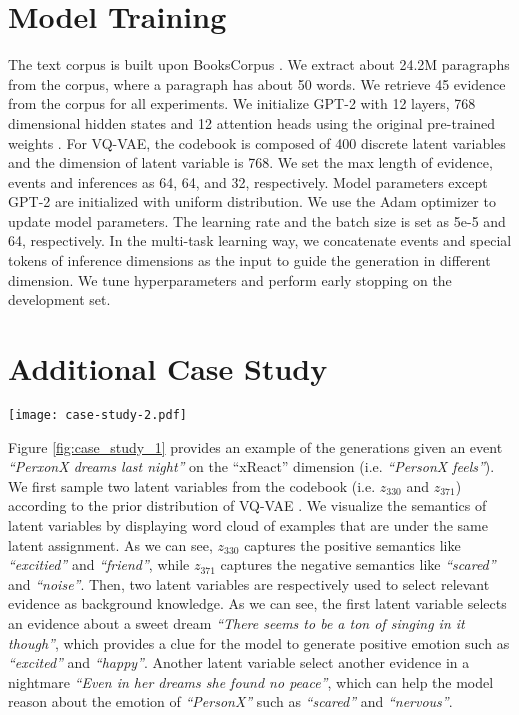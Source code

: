 \documentclass[11pt,a4paper]{article}
\begin{document}
\section{Model Training}
The text corpus is built upon BooksCorpus \cite{zhu2015aligning}. We extract about 24.2M paragraphs from the corpus, where a paragraph has about 50 words. We retrieve 45 evidence from the corpus for all experiments. We initialize GPT-2 with 12 layers, 768 dimensional hidden states and 12 attention heads using the original pre-trained weights \cite{radford2019language}. For VQ-VAE, the codebook is composed of 400 discrete latent variables and the dimension of latent variable is 768. We set the max length of evidence, events and inferences as 64, 64, and 32, respectively.
Model parameters except GPT-2 are initialized with uniform distribution. We use the Adam optimizer to update model parameters. The learning rate and the batch size is set as 5e-5 and 64, respectively.  In the multi-task learning way, we concatenate events and special tokens of inference dimensions as the input to guide the generation in different dimension. We tune hyperparameters and perform early stopping on the development set.

\section{Additional Case Study}
\begin{figure*}[t]
	\centering
	\texttt{[image: case-study-2.pdf]}
	\caption{An examples of Event2Mind dataset on the xReact dimension (i.e. \textit{``PersonX feels''}).}
	\label{fig:case_study_1}
\end{figure*}
Figure \ref{fig:case_study_1} provides an example of the generations given an event \textit{``PerxonX dreams last night''} on the ``xReact'' dimension (i.e. \textit{``PersonX feels''}). We first sample two latent variables from the codebook (i.e. $z_{330}$ and $z_{371}$) according to the prior distribution of VQ-VAE \cite{van2017neural}. We visualize the semantics of latent variables by displaying word cloud of examples that are under the same latent assignment. As we can see, $z_{330}$ captures the positive semantics like \textit{``excitied''} and \textit{``friend''}, while $z_{371}$ captures the negative semantics like \textit{``scared''} and \textit{``noise''}. Then, two latent variables are respectively used to select relevant evidence as background knowledge. As we can see, the first latent variable selects an evidence about a sweet dream \textit{``There seems to be a ton of singing in it though''}, which provides a clue for the model to generate positive emotion such as \textit{``excited''} and \textit{``happy''}. Another latent variable select another evidence in a nightmare \textit{``Even in her dreams she found no peace''}, which can help the model reason about the emotion of \textit{``PersonX''} such as \textit{``scared''} and \textit{``nervous''}. 
\end{document}
